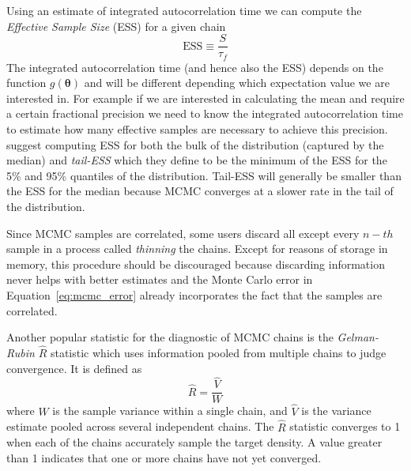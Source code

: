 \documentclass[12pt,dvipsnames]{report}
\renewcommand{\vec}[1]{\boldsymbol{\mathbf{#1}}}
\begin{document}
Using an estimate of integrated autocorrelation time  we can compute the 
\textsl{Effective Sample Size} (ESS) for a given chain \citep{sokal1997}
\begin{equation}
\mathrm{ESS}\equiv\frac{S}{\tau_f}
\end{equation}
The integrated autocorrelation time (and hence also the ESS) depends on the function 
$g(\vec\theta)$ and will be different depending which expectation value we 
are interested in.
For example if we are interested in calculating the mean and require a certain
fractional precision we need to know the integrated autocorrelation time to estimate 
how many effective samples are necessary to achieve this precision.
\citet{arXiv:1903.08008} suggest computing ESS for both the bulk of the distribution 
(captured by the median) and \textsl{tail-ESS} which they define to be the minimum 
of the ESS for the 5\% and 95\% quantiles of the distribution. Tail-ESS will generally 
be smaller  than the ESS for the median because MCMC converges at a slower rate 
in the tail of the distribution.

Since MCMC samples are correlated, some users discard all except every $n-th$ sample in a process called
\textsl{thinning} the chains. Except for reasons of storage in memory, this
procedure should be discouraged because discarding information never helps with
better estimates and the Monte Carlo error in Equation~\ref{eq:mcmc_error} 
already incorporates the fact that the samples are correlated.

Another popular statistic for the diagnostic of MCMC chains is the
\textsl{Gelman-Rubin} $\hat R$ statistic \citep{1992StaSc...7..457G} which uses 
information pooled from multiple chains to judge convergence. It is 
defined as
\begin{equation}
    \hat R= \frac{\hat V}{W}
\end{equation}
where $W$ is the sample variance within a single chain, and $\hat V$ is the
variance estimate pooled across several independent chains.
The $\hat R$ statistic converges to 1 when each of the chains accurately 
sample the target density. A value greater than 1 indicates that one or more 
chains have not yet converged.
\end{document}
